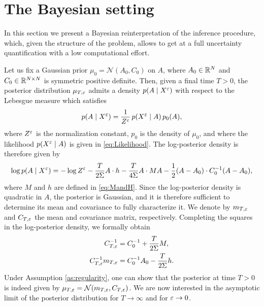 \documentclass[10pt]{article}
\begin{document}
\section{The Bayesian setting}\label{sec:Bayesian}

In this section we present a Bayesian reinterpretation of the inference procedure, which, given the structure of the problem, allows to get at a full uncertainty quantification with a low computational effort. 

Let us fix a Gaussian prior $\mu_0 = \mathcal N(A_0, C_0)$ on $A$, where $A_0 \in \mathbb{R}^N$ and $C_0 \in \mathbb{R}^{N\times N}$ is symmetric positive definite. Then, given a final time $T > 0$, the posterior distribution $\mu_{T,\varepsilon}$ admits a density $p(A \mid X^\varepsilon)$ with respect to the Lebesgue measure which satisfies
\begin{equation}
p(A \mid X^\varepsilon) = \frac1{Z^\varepsilon} \, p(X^\varepsilon \mid A) \, p_0(A),
\end{equation}
where $Z^\varepsilon$ is the normalization constant, $p_0$ is the density of $\mu_0$, and where the likelihood $p(X^\varepsilon \mid A)$ is given in \eqref{eq:Likelihood}. The log-posterior density is therefore given by
\begin{equation}\label{eq:Posterior}
\log p(A \mid X^\varepsilon) = -\log Z^\varepsilon - \frac{T}{2\Sigma} A \cdot h - \frac{T}{4\Sigma} A \cdot M A - \frac12 (A - A_0) \cdot C_0^{-1}(A-A_0),
\end{equation}
where $M$ and $h$ are defined in \eqref{eq:MandH}.
Since the log-posterior density is quadratic in $A$, the posterior is Gaussian, and it is therefore sufficient to determine its mean and covariance to fully characterize it. We denote by $m_{T,\varepsilon}$ and $C_{T,\varepsilon}$ the mean and covariance matrix, respectively. Completing the squares in the log-posterior density, we formally obtain
\begin{equation}
\begin{aligned}
C_{T,\varepsilon}^{-1} &= C_0^{-1} + \frac{T}{2\Sigma} M, \\
C_{T,\varepsilon}^{-1}m_{T,\varepsilon} &= C_0^{-1}A_0 - \frac{T}{2\Sigma} h. 
\end{aligned}
\end{equation}
Under Assumption \ref{as:regularity}, one can show that the posterior at time $T > 0$ is indeed given by $\mu_{T,\varepsilon} = \mathcal N(m_{T,\varepsilon}, C_{T,\varepsilon})$. We are now interested in the asymptotic limit of the posterior distribution for $T \to \infty$ and for $\varepsilon \to 0$.
\end{document}
